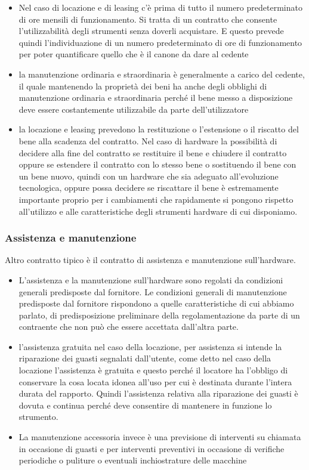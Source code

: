 \begin{itemize}
    \item Nel caso di locazione e di leasing c'è prima di tutto il numero predeterminato di ore mensili di funzionamento. Si tratta di un contratto che consente l'utilizzabilità degli strumenti senza doverli acquistare. E questo prevede quindi l'individuazione di un numero predeterminato di ore di funzionamento per poter quantificare quello che è il canone da dare al cedente
    \item la manutenzione ordinaria e straordinaria è generalmente a carico del cedente, il quale mantenendo la proprietà dei beni ha anche degli obblighi di manutenzione ordinaria e straordinaria perché il bene messo a disposizione deve essere costantemente utilizzabile da parte dell'utilizzatore 
    \item la locazione e leasing prevedono la restituzione o l'estensione o il riscatto del bene alla scadenza del contratto. Nel caso di hardware la possibilità di decidere alla fine del contratto se restituire il bene e chiudere il contratto oppure se estendere il contratto con lo stesso bene o sostituendo il bene con un bene nuovo, quindi con un hardware che sia adeguato all'evoluzione tecnologica, oppure possa decidere se riscattare il bene è estremamente importante proprio per i cambiamenti che rapidamente si pongono rispetto all'utilizzo e alle caratteristiche degli strumenti hardware di cui disponiamo.
\end{itemize}

\subsubsection{Assistenza e manutenzione}
Altro contratto tipico è il contratto di assistenza e manutenzione sull'hardware. 

\begin{itemize}
    \item L'assistenza e la manutenzione sull'hardware sono regolati da condizioni generali predisposte dal fornitore. Le condizioni generali di manutenzione predisposte dal fornitore rispondono a quelle caratteristiche di cui abbiamo parlato, di predisposizione preliminare della regolamentazione da parte di un contraente che non può che essere accettata dall'altra parte. 
    \item l'assistenza gratuita nel caso della locazione, per assistenza si intende la riparazione dei guasti segnalati dall'utente, come detto nel caso della locazione l'assistenza è gratuita e questo perché il locatore ha l'obbligo di conservare la cosa locata idonea all'uso per cui è destinata durante l'intera durata del rapporto. Quindi l'assistenza relativa alla riparazione dei guasti è dovuta e continua perché deve consentire di mantenere in funzione lo strumento. 
    \item La manutenzione accessoria invece è una previsione di interventi su chiamata in occasione di guasti e per interventi preventivi in occasione di verifiche periodiche o puliture o eventuali inchiostrature delle macchine
\end{itemize}


